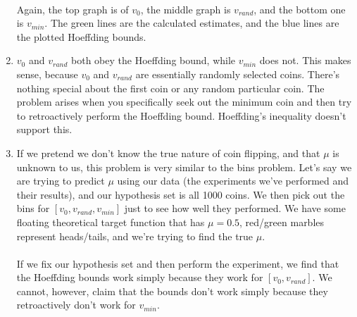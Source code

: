 \documentclass[12pt]{article}
\begin{document}
\begin{enumerate}[label=(\alph*)]
	\\ Again, the top graph is of $v_0$, the middle graph is $v_{rand}$, and the bottom one is $v_{min}$. The green lines are the calculated estimates, and the blue lines are the plotted Hoeffding bounds.
	\item $v_0$ and $v_{rand}$ both obey the Hoeffding bound, while $v_{min}$ does not. This makes sense, because $v_0$ and $v_{rand}$ are essentially randomly selected coins. There's nothing special about the first coin or any random particular coin. The problem arises when you specifically seek out the minimum coin and then try to retroactively perform the Hoeffding bound. Hoeffding's inequality doesn't support this.
	\item If we pretend we don't know the true nature of coin flipping, and that $\mu$ is unknown to us, this problem is very similar to the bins problem. Let's say we are trying to predict $\mu$ using our data (the experiments we've performed and their results), and our hypothesis set is all 1000 coins. We then pick out the bins for $[v_0, v_{rand}, v_{min}]$ just to see how well they performed. We have some floating theoretical target function that has $\mu = 0.5$, red/green marbles represent heads/tails, and we're trying to find the true $\mu$.
	\\ \\ If we fix our hypothesis set and then perform the experiment, we find that the Hoeffding bounds work simply because they work for $[v_0, v_{rand}]$. We cannot, however, claim that the bounds don't work simply because they retroactively don't work for $v_{min}$.
\end{enumerate}
\end{document}
